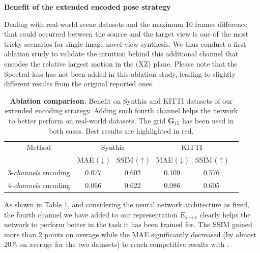 \textbf{Benefit of the extended encoded pose strategy}

Dealing with real-world scene datasets and the maximum 10 frames difference that could occurred between the source and the target view is one of the most tricky scenarios for single-image novel view synthesis. We thus conduct a first ablation study to validate the intuition behind this additional channel that encodes the relative largest motion in the (XZ) plane. Please note that the Spectral loss has not been added in this ablation study, leading to slightly different results from the original reported ones. 

\begin{table}[h!]
    \caption{\textbf{Ablation comparison.} Benefit on Synthia \citep{ros2016synthia} and KITTI \citep{geiger2012we} datasets of our extended encoding strategy. Adding such fourth channel helps the network to better perform on real-world datasets. The grid $\textbf{G}_{15}$ has been used in both cases. Best results are highlighted in \colorbox{red!25}{red}. }
    \label{tab:compExtended}
    \begin{center}%
    \begin{adjustbox}{width =.8\linewidth}
    \begin{tabular}[h]{c||ccccc}
    \hline
      Method & \multicolumn{2}{c}{Synthia} & \multicolumn{2}{c}{KITTI} \\
      &  MAE ($\downarrow$) & SSIM ($\uparrow$) & MAE ($\downarrow$) & SSIM ($\uparrow$) \\
    \hline
    3-\textit{channels} encoding & 0.077 & 0.602 & 0.109 & 0.576  \\
    4-\textit{channels} encoding & \cellcolor{red!25}0.066 & \cellcolor{red!25}0.622 & \cellcolor{red!25}0.086 & \cellcolor{red!25}0.605 \\
    \hline 
    \end{tabular}
    \end{adjustbox}
    \end{center}
    \end{table}

As shown in Table \ref{tab:compExtended}, and considering the neural network architecture as fixed, the fourth channel we have added to our representation $E_{s\xrightarrow{}t}$ clearly helps the network to perform better in the task it has been trained for.  The SSIM gained more than 2 points on average while the MAE significantly decreased (by almost 20\% on average for the two datasets) to reach competitive results with \cite{kim2020novel}. 

